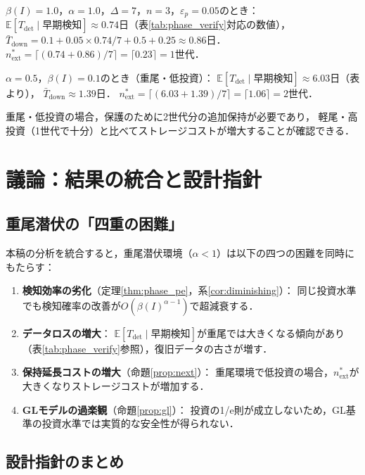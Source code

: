 \documentclass[12pt,a4paper]{article}
\theoremstyle{plain}
\theoremstyle{definition}
\theoremstyle{remark}
\newcommand{\E}{\mathbb{E}}
\newcommand{\betaI}{\beta(I)}
\begin{document}
$\betaI=1.0$，$\alpha=1.0$，$\Delta=7$，$n=3$，$\varepsilon_p=0.05$のとき：
$\E[T_{\mathrm{det}}\mid\text{早期検知}]\approx0.74$日（表\ref{tab:phase_verify}対応の数値），
$\bar{T}_{\mathrm{down}}=0.1+0.05\times0.74/7+0.5+0.25\approx0.86$日．
$n_{\mathrm{ext}}^*=\lceil(0.74+0.86)/7\rceil=\lceil0.23\rceil=1$世代．

$\alpha=0.5$，$\betaI=0.1$のとき（重尾・低投資）：
$\E[T_{\mathrm{det}}\mid\text{早期検知}]\approx6.03$日（表より），
$\bar{T}_{\mathrm{down}}\approx1.39$日．
$n_{\mathrm{ext}}^*=\lceil(6.03+1.39)/7\rceil=\lceil1.06\rceil=2$世代．

重尾・低投資の場合，保護のために2世代分の追加保持が必要であり，
軽尾・高投資（1世代で十分）と比べてストレージコストが増大することが確認できる．

\section{議論：結果の統合と設計指針}
\label{sec:discussion}

\subsection{重尾潜伏の「四重の困難」}

本稿の分析を統合すると，重尾潜伏環境（$\alpha<1$）は以下の四つの困難を同時にもたらす：

\begin{enumerate}
\item \textbf{検知効率の劣化}（定理\ref{thm:phase_pe}，系\ref{cor:diminishing}）：
  同じ投資水準でも検知確率の改善が$O(\betaI^{\alpha-1})$で超減衰する．

\item \textbf{データロスの増大}：
  $\E[T_{\mathrm{det}}\mid\text{早期検知}]$が重尾では大きくなる傾向があり
  （表\ref{tab:phase_verify}参照），復旧データの古さが増す．

\item \textbf{保持延長コストの増大}（命題\ref{prop:next}）：
  重尾環境で低投資の場合，$n_{\mathrm{ext}}^*$が大きくなりストレージコストが増加する．

\item \textbf{GLモデルの過楽観}（命題\ref{prop:gl}）：
  投資の1/e則が成立しないため，GL基準の投資水準では実質的な安全性が得られない．
\end{enumerate}

\subsection{設計指針のまとめ}
\end{document}
